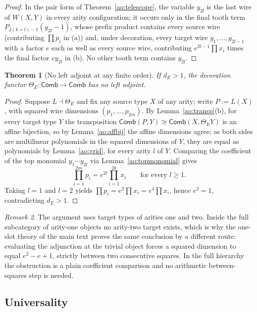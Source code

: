 \documentclass[11pt,a4paper]{article}
\theoremstyle{definition}
\theoremstyle{plain}
\newtheorem{theorem}{Theorem}[section]
\theoremstyle{remark}
\newtheorem{remark}[theorem]{Remark}
\newcommand{\Comb}{\mathsf{Comb}}
\begin{document}
\begin{proof}
In the pair form of Theorem~\ref{ao:telescope}, the variable $y_{2l}$ is
the last wire of $W(X,Y)$ in every arity configuration; it occurs only in
the final tooth term $P_{2(k+l)-1}(y_{2l}-1)$, whose prefix product
contains every source wire (contributing $\prod p_i$ in (a)) and, under
decoration, every target wire $y_1,\dots,y_{2l-1}$ with a factor $e$ each
as well as every source wire, contributing
$e^{2l-1}\prod x_i$ times the final factor $e y_{2l}$ in (b). No other
tooth term contains $y_{2l}$.
\end{proof}

\begin{theorem}[No left adjoint at any finite order]
\label{ao:left-thm}
If $d_E>1$, the decoration functor $\Theta_E:\Comb\to\Comb$ has no left
adjoint.
\end{theorem}

\begin{proof}
Suppose $L\dashv\Theta_E$ and fix any source type $X$ of any arity; write
$P:=L(X)$, with squared wire dimensions $(p_1,\dots,p_{2m})$. By
Lemma~\ref{ao:transp}(b), for every target type $Y$ the transposition
$\Comb(P,Y)\cong\Comb(X,\Theta_EY)$ is an affine bijection, so by
Lemma~\ref{ao:affbij} the affine dimensions agree; as both sides are
multilinear polynomials in the squared dimensions of $Y$, they are equal as
polynomials by Lemma~\ref{ao:grid}, for every arity $l$ of $Y$. Comparing
the coefficient of the top monomial $y_1\cdots y_{2l}$ via
Lemma~\ref{ao:topmonomial} gives
\[
\prod_{i=1}^{2m}p_i=e^{2l}\prod_{i=1}^{2k}x_i
\qquad\text{for every }l\ge 1.
\]
Taking $l=1$ and $l=2$ yields $\prod p_i=e^2\prod x_i=e^4\prod x_i$, hence
$e^2=1$, contradicting $d_E>1$.
\end{proof}

\begin{remark}
The argument uses target types of arities one and two. Inside the full
subcategory of arity-one objects no arity-two target exists, which is why
the one-slot theory of the main text proves the same conclusion by a different route:
evaluating the adjunction at the trivial object forces a squared dimension
to equal $e^2-e+1$, strictly between two consecutive squares. In the full
hierarchy the obstruction is a plain coefficient comparison and no
arithmetic between-squares step is needed.
\end{remark}

\subsection{Universality}
\label{ao:universality}
\end{document}
